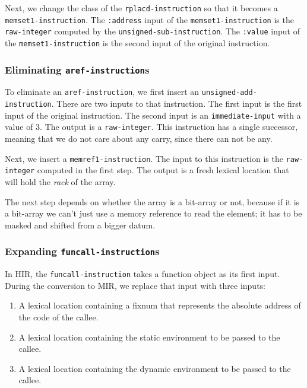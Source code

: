 Next, we change the class of the \texttt{rplacd-instruction} so that
it becomes a \texttt{memset1-instruction}.  The \texttt{:address}
input of the \texttt{memset1-instruction} is the \texttt{raw-integer}
computed by the \texttt{unsigned-sub-instruction}.  The
\texttt{:value} input of the \texttt{memset1-instruction} is the
second input of the original instruction.

\subsubsection{Eliminating \texttt{aref-instruction}s}

To eliminate an \texttt{aref-instruction}, we first insert an
\texttt{unsigned-add-instruction}.  There are two inputs to that
instruction.  The first input is the first input of the original
instruction.  The second input is an \texttt{immediate-input} with a
value of 3.  The output is a \texttt{raw-integer}.  This instruction
has a single successor, meaning that we do not care about any carry,
since there can not be any.

Next, we insert a \texttt{memref1-instruction}.  The input to this
instruction is the \texttt{raw-integer} computed in the first step.
The output is a fresh lexical location that will hold the \emph{rack}
of the array.

The next step depends on whether the array is a bit-array or not,
because if it is a bit-array we can't just use a memory reference to
read the element; it has to be masked and shifted from a bigger
datum.

\subsubsection{Expanding \texttt{funcall-instruction}s}

In HIR, the \texttt{funcall-instruction} takes a function object as
its first input.  During the conversion to MIR, we replace that input
with three inputs:

\begin{enumerate}
\item A lexical location containing a fixnum that represents the
  absolute address of the code of the callee.
\item A lexical location containing the static environment to be
  passed to the callee.
\item A lexical location containing the dynamic environment to be
  passed to the callee.
\end{enumerate}


